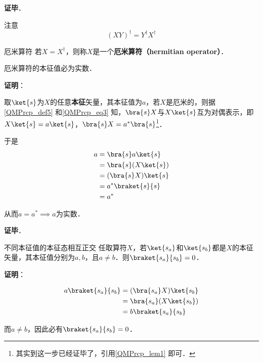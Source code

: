 \textbf{证毕}．




注意
\begin{equation}
(XY)^\dagger = Y^\dagger X^\dagger
\end{equation}


\begin{definition}{厄米算符}\label{QMPrcp_def12}
若$X=X^\dagger$，则称$X$是一个\textbf{厄米算符（hermitian operator）}．
\end{definition}

\begin{theorem}{}\label{QMPrcp_the2}
厄米算符的本征值必为实数．
\end{theorem}

\textbf{证明}：

取$\ket{s}$为$X$的任意\textbf{本征}矢量，其本征值为$a$，若$X$是厄米的，则据\autoref{QMPrcp_def5} 和\autoref{QMPrcp_eq3} 知，$\bra{s}X$与$X\ket{s}$互为对偶表示，即$X\ket{s}=a\ket{s}$，$\bra{s}X=a^*\bra{s}$\footnote{其实到这一步已经证毕了，引用\autoref{QMPrcp_lem1} 即可．}．

于是
\begin{equation}\label{QMPrcp_eq5}
\begin{aligned}
a&=\bra{s}a\ket{s}\\
&=\bra{s}(X\ket{s})\\
&=(\bra{s}X)\ket{s}\\
&=a^*\braket{s}{s}\\
&=a^*
\end{aligned}
\end{equation}

从而$a=a^*\implies a$为实数．

\textbf{证毕}．


\begin{theorem}{不同本征值的本征态相互正交}\label{QMPrcp_the3}
任取算符$X$，若$\ket{s_a}$和$\ket{s_b}$都是$X$的本征矢量，其本征值分别为$a,b$，且$a\neq b$．则$\braket{s_a}{s_b}=0$．
\end{theorem}

\textbf{证明}：

\begin{equation}
\begin{aligned}
a\braket{s_a}{s_b}&=(\bra{s_a}X)\ket{s_b}\\
&=\bra{s_a}(X\ket{s_b})\\
&=b\braket{s_a}{s_b}
\end{aligned}
\end{equation}

而$a\neq b$，因此必有$\braket{s_a}{s_b}=0$．

